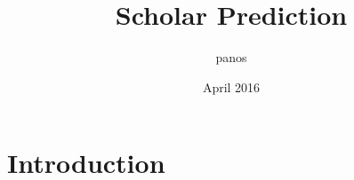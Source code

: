 \documentclass{article}
\title{Scholar Prediction}
\author{panos }
\date{April 2016}
\begin{document}
\maketitle

\section{Introduction}
\end{document}

